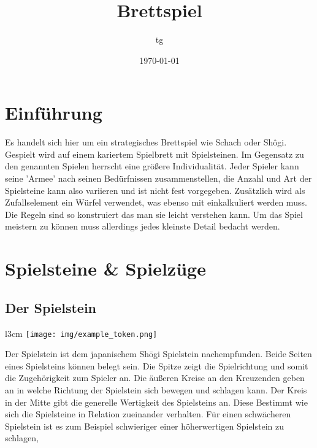 \documentclass{article}
\title{Brettspiel}
\author{tg}
\date{\today}
\begin{document}
\section{Einführung}
	Es handelt sich hier um ein strategisches Brettspiel wie Schach oder Shôgi.
	Gespielt wird auf einem kariertem Spielbrett mit Spielsteinen.
	Im Gegensatz zu den genannten Spielen herrscht eine größere Individualität.
	Jeder Spieler kann seine 'Armee' nach seinen Bedürfnissen zusammenstellen, die
	Anzahl und Art der Spielsteine kann also variieren und ist nicht fest vorgegeben.
	Zusätzlich wird als Zufallselement ein Würfel verwendet, was ebenso mit einkalkuliert 
	werden muss.
	Die Regeln sind so konstruiert das man sie leicht verstehen kann. Um das Spiel meistern
	zu können muss allerdings jedes kleinste Detail bedacht werden.
	
	
	


\section{Spielsteine \& Spielzüge}

\subsection{Der Spielstein}
		
	\begin{wrapfigure}{l}{3cm}
	\centering
	\texttt{[image: img/example\_token.png]}
	\end{wrapfigure}
	
	Der Spielstein ist dem japanischem Sh\=ogi Spielstein nachempfunden. Beide Seiten eines Spielsteins können belegt sein.
	Die Spitze zeigt die Spielrichtung und somit die Zugehörigkeit zum Spieler an.
	Die äußeren Kreise an den Kreuzenden geben an in welche Richtung der Spielstein sich bewegen und schlagen kann.
	Der Kreis in der Mitte gibt die generelle Wertigkeit des Spielsteins an. Diese Bestimmt wie sich die Spielsteine in Relation zueinander verhalten.
	Für einen schwächeren Spielstein ist es zum Beispiel schwieriger einer höherwertigen Spielstein zu schlagen,
		
\end{document}
